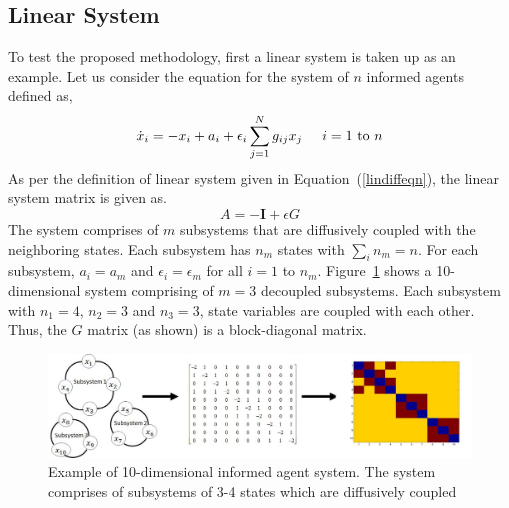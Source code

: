 \subsection{Linear System}
\label{linear_system}

To test the proposed methodology, first a linear system is taken up as an example. Let us consider the equation for the system of $n$ informed agents~\cite{xia2011clustering} defined as,
\begin{equation}
\label{lin_syst}
\begin{array}{l}
\dot{x}_i = -x_i + a_i + \epsilon_i \displaystyle \sum_{j=1}^N g_{ij} x_j \hspace{5 mm} i = 1 \text{ to } n
\end{array}
\end{equation}
As per the definition of linear system given in Equation~(\ref{lindiffeqn}), the linear system matrix is given as.
\begin{equation}
A = -\textbf{I} + \epsilon G
\end{equation}
The system comprises of $m$ subsystems that are diffusively coupled with the neighboring states. Each subsystem has $n_m$ states with $\sum_{i} n_m = n$. For each subsystem, $a_i = a_m$ and $\epsilon_i = \epsilon_m$ for all $i = 1$ to $n_m$. Figure~\ref{linsyst} shows a 10-dimensional system comprising of $m = 3$ decoupled subsystems. Each subsystem with $n_1 = 4$, $n_2 = 3$ and $n_3 = 3$, state variables are coupled with each other. Thus, the $G$ matrix (as shown) is a block-diagonal matrix. 

\begin{figure}[H]
        \centering
        \includegraphics[width=\textwidth]{figures/FIG_10}
        \caption{Example of 10-dimensional informed agent system. The system comprises of subsystems of 3-4 states which are diffusively coupled}
        \label{linsyst}
\end{figure}

